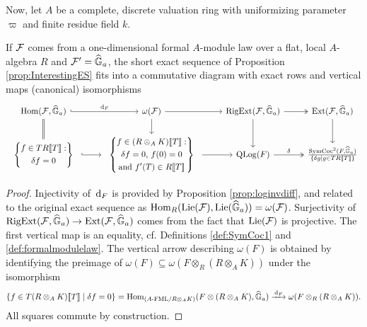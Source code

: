 \documentclass[../main.tex]{subfiles}
\begin{document}
Now, let $A$ be a complete, discrete valuation ring with 
uniformizing parameter $\varpi$ and finite residue field $k$. 
\begin{prop} \label{prop:ExplicitInterestingES}
  If $\mathcal{F}$ comes from a one-dimensional formal $A$-module law over a flat, local
  $A$-algebra $R$ and $\mathcal{F}' = \widehat{\mathbb{G}}_a$,
  the short exact sequence of Proposition \ref{prop:InterestingES}
  fits into a commutative diagram with 
  exact rows and vertical maps (canonical) isomorphisms
\begin{equation*}
\begin{tikzcd}[ampersand replacement=\&]
  {\Hom(\cF,\Ghat_a)} \& {\omega(\cF)} \& {\RigExt(\cF,\Ghat_a)} \&
  {\Ext(\cF,\Ghat_a)} \\ 
  \begin{array}{c} \left\{\begin{gathered} f \in TR\llbr T \rrbr : \\  \delta f
    = 0\end{gathered}  \right\} \end{array} \& \begin{array}{c}
    \left\{\begin{gathered} f \in (R\otimes_A K)\llbr T \rrbr : \\ 
  \text{$\delta f = 0$, $f(0) = 0$} \\
    \text{and $f'(T) \in R\llbr T \rrbr$}\end{gathered} \right\} \end{array} \& {\QLog(F)} \&
    {\frac{\SymCoc^2(F, \Ghat_a)}{\{\delta g \mid g \in T R\llbr T \rrbr\}}}
	\arrow[hook, "{\dc_F}", from=1-1, to=1-2]
	\arrow[Rightarrow, no head, from=1-1, to=2-1]
	\arrow[from=1-2, to=1-3]
	\arrow[from=1-2, to=2-2]
	\arrow[two heads, from=1-3, to=1-4]
	\arrow[from=1-3, to=2-3]
	\arrow[from=1-4, to=2-4]
	\arrow[hook, from=2-1, to=2-2]
	\arrow[from=2-2, to=2-3]
	\arrow["\delta", two heads, from=2-3, to=2-4]
\end{tikzcd}
\end{equation*}
\begin{proof}
  Injectivity of $\, \mathrm{d}_F$ is provided by Proposition \ref{prop:loginvdiff},
  and related to the original exact sequence as $\operatorname{Hom}_R(\operatorname{Lie}(\mathcal{F}), \operatorname{Lie}(\widehat{\mathbb{G}}_a)) = 
  \omega(\mathcal{F})$.
  Surjectivity of $\operatorname {RigExt}(\mathcal{F}, \widehat{\mathbb{G}}_a) \to \operatorname{Ext}(\mathcal{F}, \widehat{\mathbb{G}}_a)$ comes from the
  fact that $\operatorname{Lie}(\mathcal{F})$ is projective. 
  The first vertical map is an equality, cf. Definitions
  \ref{def:SymCoc1} and \ref{def:formalmodulelaw}. 
  The vertical arrow describing $\omega(F)$ is obtained by
  identifying the preimage of $\omega(F) \subseteq \omega(F \otimes_R (R
  \otimes_AK))$ under the isomorphism 
  \begin{equation*}
    \{f \in T(R \otimes_A K)\llbracket T \rrbracket \mid \delta f = 0\} = \operatorname{Hom}_{{({A}\text-\allowbreak\mathrm{FML}/{R \otimes_A K})}} (F \otimes (R \otimes_A K), \widehat{\mathbb{G}}_a) \xrightarrow{\, \mathrm{d}_F} \omega(F
    \otimes_R (R \otimes_AK)).
  \end{equation*}
  All squares commute by construction.
\end{proof}
\end{prop}
\end{document}
